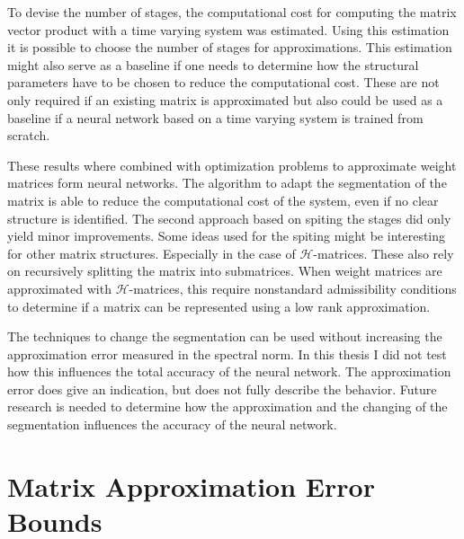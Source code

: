 \documentclass[doctype=mastersthesis,BCOR=15mm,biblatex]{ldvbook}%
\begin{document}
To devise the number of stages, the computational cost for computing the matrix vector product with a time varying system was estimated.
Using this estimation it is possible to choose the number of stages for approximations.
This estimation might also serve as a baseline if one needs to determine how the structural parameters have to be chosen to reduce the computational cost.
These are not only required if an existing matrix is approximated but also could be used as a baseline if a neural network based on a time varying system is trained from scratch.

These results where combined with optimization problems to approximate weight matrices form neural networks.
The algorithm to adapt the segmentation of the matrix is able to reduce the computational cost of the system, even if no clear structure is identified.
The second approach based on spiting the stages did only yield minor improvements.
Some ideas used for the spiting might be interesting for other matrix structures.
Especially in the case of $\mathcal{H}$-matrices.
These also rely on recursively splitting the matrix into submatrices.
When weight matrices are approximated with $\mathcal{H}$-matrices, this require nonstandard admissibility conditions to determine if a matrix can be represented using a low rank approximation.

The techniques to change the segmentation can be used without increasing the approximation error measured in the spectral norm.
In this thesis I did not test how this influences the total accuracy of the neural network. 
The approximation error does give an indication, but does not fully describe the behavior.
Future research is needed to determine how the approximation and the changing of the segmentation influences the accuracy of the neural network.

\appendix
\chapter{Matrix Approximation Error Bounds}\label{A:Error Bounds}
\end{document}
